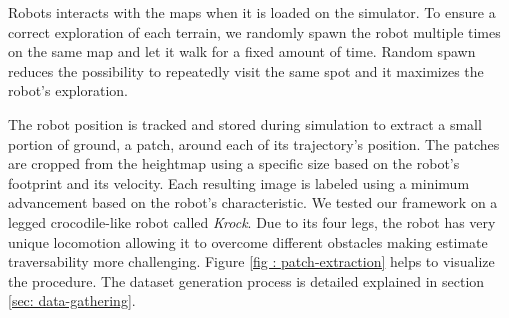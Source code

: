 \documentclass[../document.tex]{subfiles}
\begin{document}
Robots interacts with the maps when it is loaded on the simulator. To ensure a correct exploration of each terrain, we randomly spawn the robot multiple times on the same map and let it walk for a fixed amount of time. Random spawn reduces the possibility to repeatedly visit the same spot and it maximizes the robot's exploration.

The robot position is tracked and stored during simulation to extract a small portion of ground, a patch, around each of its trajectory's position. The patches are cropped from the heightmap using a specific size based on the robot's footprint and its velocity. Each resulting image is labeled using a minimum advancement based on the robot's characteristic. We tested our framework on a legged crocodile-like robot called \emph{Krock}. Due to its four legs, the robot has very unique locomotion allowing it to overcome different obstacles making estimate traversability more challenging. Figure \ref{fig : patch-extraction} helps to visualize the procedure. The dataset generation process is detailed explained in section \ref{sec: data-gathering}.  
\end{document}
